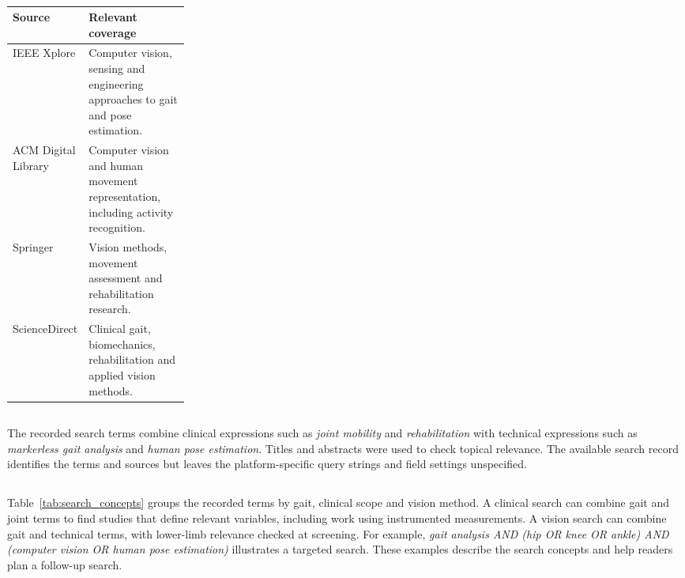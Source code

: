 \begin{table}[!htbp]
\centering\small
\caption{}
\label{tab:review_sources}
\color{RevisionRed}
\renewcommand{\arraystretch}{1.07}
\begin{tabularx}{0.98\linewidth}{@{}p{0.26\linewidth}>{\raggedright\arraybackslash}X@{}}
\toprule
\textbf{Source} & \textbf{Relevant coverage} \\
\midrule
IEEE Xplore & Computer vision, sensing and engineering approaches to gait and pose estimation. \\
ACM Digital Library & Computer vision and human movement representation, including activity recognition. \\
Springer & Vision methods, movement assessment and rehabilitation research. \\
ScienceDirect & Clinical gait, biomechanics, rehabilitation and applied vision methods. \\
\bottomrule
\end{tabularx}
\end{table}

\subsection{}
\label{sec:search_fields}
\begin{redrevision}
The recorded search terms combine clinical expressions such as \emph{joint mobility} and \emph{rehabilitation} with technical expressions such as \emph{markerless gait analysis} and \emph{human pose estimation}. Titles and abstracts were used to check topical relevance. The available search record identifies the terms and sources but leaves the platform-specific query strings and field settings unspecified.
\end{redrevision}

\subsection{}
\label{sec:search_concepts}
\begin{redrevision}
Table~\ref{tab:search_concepts} groups the recorded terms by gait, clinical scope and vision method. A clinical search can combine gait and joint terms to find studies that define relevant variables, including work using instrumented measurements. A vision search can combine gait and technical terms, with lower-limb relevance checked at screening. For example, \emph{gait analysis AND (hip OR knee OR ankle) AND (computer vision OR human pose estimation)} illustrates a targeted search. These examples describe the search concepts and help readers plan a follow-up search.
\end{redrevision}

